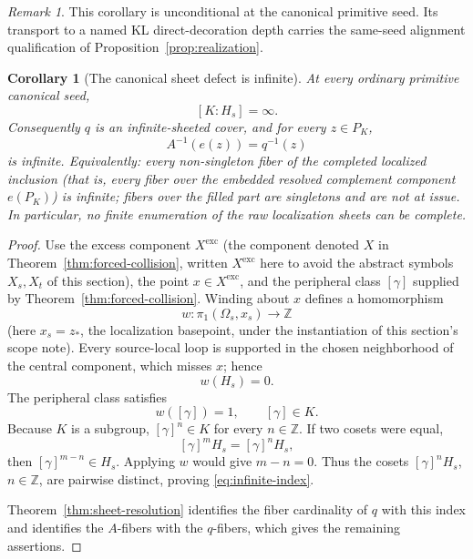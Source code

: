 \documentclass[11pt,reqno]{amsart}
\newtheorem{corollary}[theorem]{Corollary}
\theoremstyle{definition}
\theoremstyle{remark}
\newtheorem{remark}[theorem]{Remark}
\begin{document}
\begin{remark}
This corollary is unconditional at the canonical primitive seed.  Its
transport to a named KL direct-decoration depth carries the same-seed
alignment qualification of Proposition~\ref{prop:realization}.
\end{remark}
\begin{corollary}[The canonical sheet defect is infinite]\label{cor:infinite-defect}
At every ordinary primitive canonical seed,
\begin{equation}\label{eq:infinite-index}
  [K:H_s]=\infty .
\end{equation}
Consequently \( q \) is an infinite-sheeted cover, and for every \( z\in P_K \),
\[
  A^{-1}(e(z))=q^{-1}(z)
\]
is infinite.  Equivalently: every non-singleton fiber of the completed localized inclusion (that is, every fiber over the embedded resolved complement component \( e(P_K) \)) is infinite; fibers over the filled part are singletons and are not at issue.  In particular, no finite enumeration of the raw localization sheets can be complete.
\end{corollary}

\begin{proof}
Use the excess component \( X^{\mathrm{exc}} \) (the component denoted \( X \) in Theorem~\ref{thm:forced-collision}, written \( X^{\mathrm{exc}} \) here to avoid the abstract symbols \( X_s,X_t \) of this section), the point \( x\in X^{\mathrm{exc}} \), and the peripheral class \( [\gamma] \) supplied by Theorem~\ref{thm:forced-collision}.  Winding about \( x \) defines a homomorphism
\[
  w\colon\pi_1(\Omega_s,x_s)\longrightarrow\mathbb Z
\]
(here \( x_s=z_* \), the localization basepoint, under the instantiation of this section's scope note).
Every source-local loop is supported in the chosen neighborhood of the central component, which misses \( x \); hence
\[
  w(H_s)=0 .
\]
The peripheral class satisfies
\[
  w([\gamma])=1,
  \qquad
  [\gamma]\in K .
\]
Because \( K \) is a subgroup, \( [\gamma]^n\in K \) for every \( n\in\mathbb Z \).  If two cosets were equal,
\[
  [\gamma]^mH_s=[\gamma]^nH_s,
\]
then \( [\gamma]^{m-n}\in H_s \).  Applying \( w \) would give \( m-n=0 \).  Thus the cosets \( [\gamma]^nH_s \), \( n\in\mathbb Z \), are pairwise distinct, proving \eqref{eq:infinite-index}.

Theorem~\ref{thm:sheet-resolution} identifies the fiber cardinality of \( q \) with this index and identifies the \( A \)-fibers with the \( q \)-fibers, which gives the remaining assertions.
\end{proof}
\end{document}
